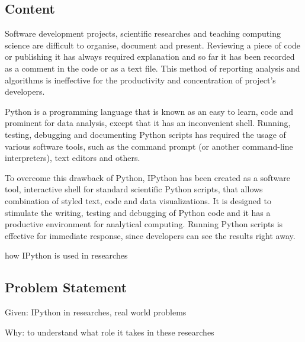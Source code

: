 \subsection{Content}

Software development projects, scientific researches and teaching computing science are difficult to organise, document and present. Reviewing a piece of code or publishing it has always required explanation and so far it has been recorded as a comment in the code or as a text file. This method of reporting analysis and algorithms is ineffective for the productivity and concentration of project's developers. 

Python is a programming language that is known as an easy to learn, code and prominent for data analysis, except that it has an inconvenient shell. Running, testing, debugging and documenting Python scripts has required the usage of various software tools, such as the command prompt (or another command-line interpreters), text editors and others. 

To overcome this drawback of Python, IPython has been created as a software tool, interactive shell for standard scientific Python scripts, that allows combination of styled text, code and data visualizations. It is designed to stimulate the writing, testing and debugging of Python code and it has a productive environment for analytical computing. \cite{mckinney2012python} Running Python scripts is effective for immediate response, since developers can see the results right away.

how IPython is used in researches

\subsection{Problem Statement}
\label{subsec:problem}

Given: IPython in researches, real world problems

Why: to understand what role it takes in these researches

